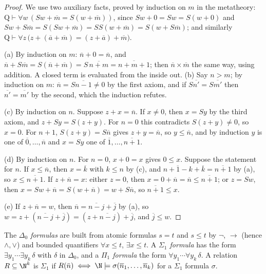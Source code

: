 \begin{proof}
We use two auxiliary facts, proved by induction on $m$ in the metatheory: $\mathrm Q\vdash\forall w\,(Sw+\overline m=S(w+\overline m))$, since $Sw+0=Sw=S(w+0)$ and $Sw+S\overline m=S(Sw+\overline m)=SS(w+\overline m)=S(w+S\overline m)$; and similarly $\mathrm Q\vdash\forall z\,\bigl(z+(\overline a+\overline m)=(z+\overline a)+\overline m\bigr)$.

(a) By induction on $m$: $\overline n+0=\overline n$, and $\overline n+S\overline m=S(\overline n+\overline m)=S\,\overline{n+m}=\overline{n+m+1}$; then $\overline n\times\overline m$ the same way, using addition. A closed term is evaluated from the inside out. (b) Say $n>m$; by induction on $m$: $\overline n=S\overline{n-1}\ne0$ by the first axiom, and if $S\overline{n'}=S\overline{m'}$ then $\overline{n'}=\overline{m'}$ by the second, which the induction refutes.

(c) By induction on $n$. Suppose $z+x=\overline n$. If $x\ne0$, then $x=Sy$ by the third axiom, and $z+Sy=S(z+y)$. For $n=0$ this contradicts $S(z+y)\ne0$, so $x=0$. For $n+1$, $S(z+y)=S\overline n$ gives $z+y=\overline n$, so $y\le\overline n$, and by induction $y$ is one of $\overline0,\dots,\overline n$ and $x=Sy$ one of $\overline1,\dots,\overline{n+1}$.

(d) By induction on $n$. For $n=0$, $x+0=x$ gives $0\le x$. Suppose the statement for $n$. If $x\le\overline n$, then $x=\overline k$ with $k\le n$ by (c), and $\overline{n+1-k}+\overline k=\overline{n+1}$ by (a), so $x\le\overline{n+1}$. If $z+\overline n=x$: either $z=0$, then $x=0+\overline n=\overline n\le\overline{n+1}$; or $z=Sw$, then $x=Sw+\overline n=S(w+\overline n)=w+S\overline n$, so $\overline{n+1}\le x$.

(e) If $z+\overline n=w$, then $\overline n=\overline{n-j}+\overline j$ by (a), so $w=z+(\overline{n-j}+\overline j)=(z+\overline{n-j})+\overline j$, and $\overline j\le w$.
\end{proof}

\begin{definition}\label{def:delta0}
The \emph{$\Delta_0$ formulas} are built from atomic formulas $s=t$ and $s\le t$ by $\neg$, $\to$ (hence $\land,\lor$) and bounded quantifiers $\forall x\le t$, $\exists x\le t$. A \emph{$\Sigma_1$ formula} has the form $\exists y_1\cdots\exists y_k\,\delta$ with $\delta$ in $\Delta_0$, and a \emph{$\Pi_1$ formula} the form $\forall y_1\cdots\forall y_k\,\delta$. A relation $R\subseteq\N^k$ is \emph{$\Sigma_1$} if $R(\bar n)\iff\N\models\sigma(\overline n_1,\dots,\overline n_k)$ for a $\Sigma_1$ formula $\sigma$.
\end{definition}

